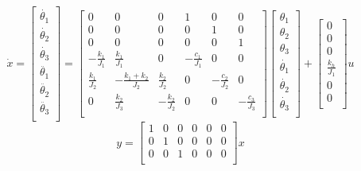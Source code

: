 \begin{equation}
\dot{x} = 
\left[\begin{array}{c}
\dot{\theta_1} \\
\dot{\theta_2} \\
\dot{\theta_3} \\
\ddot{\theta_1} \\
\ddot{\theta_2} \\
\ddot{\theta_3} \\
\end{array}\right]
= 
\left[\begin{array}{cccccc}
     0           &     0                &      0           &     1            &     0            &     0            \\
     0           &     0                &      0           &     0            &     1            &     0            \\
     0           &     0                &      0           &     0            &     0            &     1            \\
-\frac{k_1}{J_1} &  \frac{k_1}{J_1}     &      0           & -\frac{c_1}{J_1} &     0            &     0            \\
 \frac{k_1}{J_2} & -\frac{k_1+k_2}{J_2} &  \frac{k_2}{J_2} &     0            & -\frac{c_2}{J_2} &     0            \\
     0           &  \frac{k_2}{J_3}     & -\frac{k_2}{J_2} &     0            &     0            & -\frac{c_3}{J_3} \\
\end{array}\right]
\left[\begin{array}{c}
\theta_1 \\
\theta_2 \\
\theta_3 \\
\dot{\theta_1} \\
\dot{\theta_2} \\
\dot{\theta_3} \\
\end{array}\right]
+
\left[\begin{array}{c}
0 \\
0 \\
0 \\
\frac{k_{h}}{J_1} \\
0 \\
0 \\
\end{array}\right]u
\end{equation}
\begin{equation}
y = \left[\begin{array}{cccccc} 
1 & 0 & 0 & 0 & 0 & 0 \\
0 & 1 & 0 & 0 & 0 & 0 \\
0 & 0 & 1 & 0 & 0 & 0 \\
\end{array}\right]x
\end{equation}

